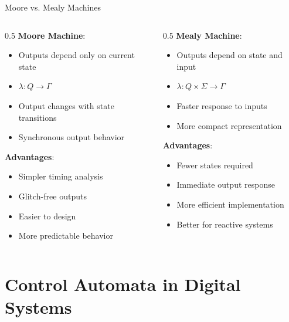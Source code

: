 \documentclass[aspectratio=169,11pt]{beamer}
\newcommand{\concept}[1]{\textbf{\color{accentcolor}#1}}
\begin{document}
\begin{frame}{Moore vs. Mealy Machines}
\begin{columns}
\begin{column}{0.5\textwidth}
\concept{Moore Machine}:
\begin{itemize}
\item Outputs depend only on current state
\item $\lambda: Q \rightarrow \Gamma$
\item Output changes with state transitions
\item Synchronous output behavior
\end{itemize}

\vspace{0.3cm}
\concept{Advantages}:
\begin{itemize}
\item Simpler timing analysis
\item Glitch-free outputs
\item Easier to design
\item More predictable behavior
\end{itemize}
\end{column}
\begin{column}{0.5\textwidth}
\concept{Mealy Machine}:
\begin{itemize}
\item Outputs depend on state and input
\item $\lambda: Q \times \Sigma \rightarrow \Gamma$
\item Faster response to inputs
\item More compact representation
\end{itemize}

\vspace{0.3cm}
\concept{Advantages}:
\begin{itemize}
\item Fewer states required
\item Immediate output response
\item More efficient implementation
\item Better for reactive systems
\end{itemize}
\end{column}
\end{columns}
\end{frame}

\section{Control Automata in Digital Systems}
\end{document}
